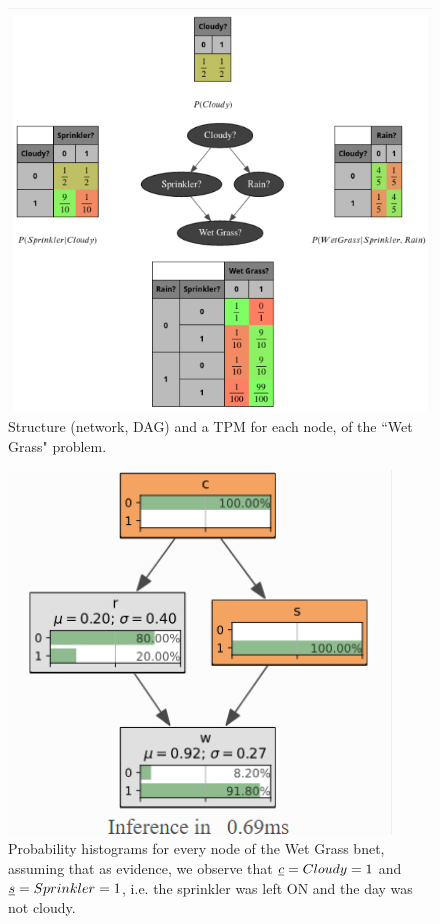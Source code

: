 \begin{figure}[h!]
\centering
\includegraphics[width=5in]
{bnet-apps/wet-grass-bnet}
\caption{Structure (network, DAG) and a TPM for each node, of the ``Wet Grass" 
problem.}
\label{fig-wet-grass-bnet}
\end{figure}

\begin{figure}[h!]
\centering
\includegraphics[width=4in]
{bnet-apps/wet-grass-evidence}
\caption{Probability histograms for every node of the Wet Grass bnet,
assuming that as evidence, we observe that ${\underline{c}}=Cloudy=1$ and ${\underline{s}}=Sprinkler=1$, i.e. the sprinkler was left ON and the day was not cloudy.}
\label{fig-wet-grass-evidence}
\end{figure}

